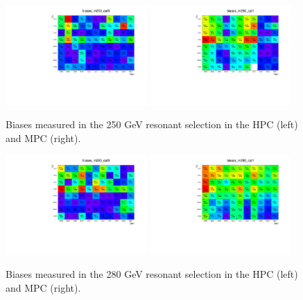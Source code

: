 \begin{figure}[h]
  \centering
  \includegraphics[width=0.48\textwidth]{figures/sec-bias/biases_m250_cat0.pdf}\hfil
  \includegraphics[width=0.48\textwidth]{figures/sec-bias/biases_m250_cat1.pdf}\hfil
  \caption{Biases measured in the 250 GeV resonant selection in the HPC (left) and MPC (right).}
  \label{fig:bkg_bias1}
\end{figure}
\begin{figure}[h]
  \centering
  \includegraphics[width=0.48\textwidth]{figures/sec-bias/biases_m280_cat0.pdf}\hfil
  \includegraphics[width=0.48\textwidth]{figures/sec-bias/biases_m280_cat1.pdf}\hfil
  \caption{Biases measured in the 280 GeV resonant selection in the HPC (left) and MPC (right).}
  \label{fig:bkg_bias2}
\end{figure}
